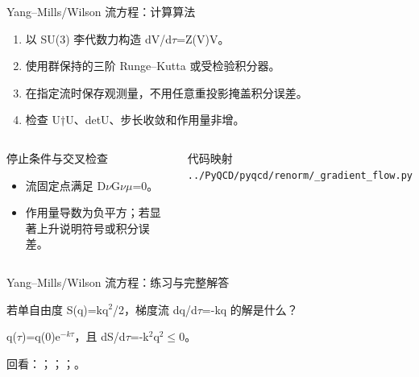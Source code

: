 \begin{frame}[t]{Yang--Mills/\allowbreak{}Wilson 流方程：计算算法}
\footnotesize
{}\begin{enumerate}
\item 以 SU(3) 李代数力构造 dV/\allowbreak{}d\ensuremath{\tau}=Z(V)V。
\item 使用群保持的三阶 Runge--Kutta 或受检验积分器。
\item 在指定流时保存观测量，不用任意重投影掩盖积分误差。
\item 检查 U†U、detU、步长收敛和作用量非增。
\end{enumerate}\begin{columns}[T,onlytextwidth]
\begin{block}{停止条件与交叉检查}\scriptsize\begin{itemize}
\item[\CheckMark] 流固定点满足 D\ensuremath{\nu}G\ensuremath{\nu}\ensuremath{\mu}=0。
\item[\CheckMark] 作用量导数为负平方；若显著上升说明符号或积分误差。
\end{itemize}\end{block}
\begin{block}{代码映射}
\scriptsize \texttt{.\allowbreak{}.\allowbreak{}/\allowbreak{}PyQCD/\allowbreak{}pyqcd/\allowbreak{}renorm/\allowbreak{}\_\allowbreak{}gradient\_\allowbreak{}flow.\allowbreak{}py}
\end{block}\end{columns}\end{frame}

\begin{frame}[t]{Yang--Mills/\allowbreak{}Wilson 流方程：练习与完整解答}
\footnotesize
\begin{block}{}若单自由度 S(q)=kq\ensuremath{^{2}}/\allowbreak{}2，梯度流 dq/\allowbreak{}d\ensuremath{\tau}=-kq 的解是什么？\end{block}
\begin{exampleblock}{}q(\ensuremath{\tau})=q(0)e\ensuremath{^{-k\tau}}，且 dS/\allowbreak{}d\ensuremath{\tau}=-k\ensuremath{^{2}}q\ensuremath{^{2}}\ensuremath{\le}0。\end{exampleblock}
\vfill
\scriptsize 回看：；；；。
\end{frame}

